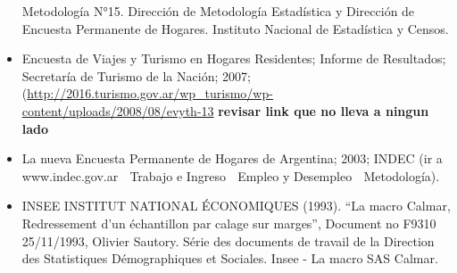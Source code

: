 \documentclass[
  openany]{book}
\begin{document}
\begin{itemize}
  Metodología N°15. Dirección de Metodología Estadística y Dirección
  de Encuesta Permanente de Hogares. Instituto Nacional de Estadística
  y Censos.
\item
  Encuesta de Viajes y Turismo en Hogares Residentes; Informe de
  Resultados; Secretaría de Turismo de la Nación; 2007;
  (\href{http://2016.turismo.gov.ar/wp_turismo/wp-content/uploads/2008/08/evyth-13-08.pdf}{http://2016.turismo.gov.ar/wp\_turismo/wp-content/uploads/2008/08/evyth-13} \textbf{revisar link que no lleva a ningun lado}
\item
  La nueva Encuesta Permanente de Hogares de Argentina; 2003; INDEC
  (ir a www.indec.gov.ar  Trabajo e Ingreso  Empleo y Desempleo 
  Metodología).
\item
  INSEE INSTITUT NATIONAL ÉCONOMIQUES (1993). ``La macro Calmar,
  Redressement d'un échantillon par calage sur marges'', Document no
  F9310 25/11/1993, Olivier Sautory. Série des documents de travail de
  la Direction des Statistiques Démographiques et Sociales. Insee - La
  macro SAS Calmar.
\end{itemize}

  
\end{document}
